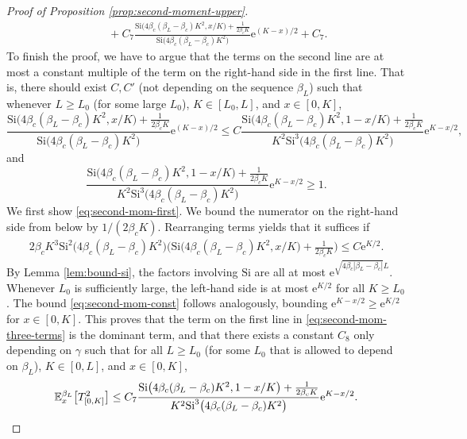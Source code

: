 \documentclass[a4paper, a4wide, 10pt, reqno]{amsart}
\theoremstyle{plain}
\theoremstyle{definition}
\numberwithin{equation}{section}
\newcommand{\E}{\mathbb E}
\newcommand{\re}{{\mathrm e}}
\newcommand{\Si}{{\mathrm{Si}}}
\begin{document}
\begin{proof}[Proof of  Proposition \ref{prop:second-moment-upper}]
\begin{equation}
\begin{aligned}
    &\hspace{15pt}+ C_7\frac{\Si\big(4\beta_c(\beta_L-\beta_c) K^2, x/ K\big)+\frac{1}{2\beta_c K}}{ \Si\big(4\beta_c(\beta_L-\beta_c) K^2\big)}\re^{(K-x)/2} + C_7.
    \end{aligned}
    \end{equation}
    To finish the proof, we have to argue that the terms on the second line are at most a constant multiple of the term on the right-hand side in the first line. That is, there should exist $C, C'$ (not depending on the sequence $\beta_L$) such that whenever $L\ge L_0$ (for some large $L_0$), $K\in[L_0, L]$, and $x\in[0, K]$, 
    \begin{equation}\label{eq:second-mom-first}
        \frac{\Si\big(4\beta_c(\beta_L-\beta_c) K^2, x/ K\big)+\frac{1}{2\beta_c K}}{ \Si\big(4\beta_c(\beta_L-\beta_c) K^2\big)}\re^{(K-x)/2}\le C\frac{\Si\big(4\beta_c(\beta_L-\beta_c) K^2, 1-x/ K\big)+\frac{1}{2\beta_c K}}{ K^2\Si^3\big(4\beta_c(\beta_L-\beta_c) K^2\big)}\re^{ K-x/2},
    \end{equation}
    and 
    \begin{equation}\label{eq:second-mom-const}
        \frac{\Si\big(4\beta_c(\beta_L-\beta_c) K^2, 1-x/ K\big)+\frac{1}{2\beta_c K}}{ K^2\Si^3\big(4\beta_c(\beta_L-\beta_c) K^2\big)}\re^{ K-x/2} \ge 1.
    \end{equation}
    We first show \eqref{eq:second-mom-first}. We bound the numerator on the right-hand side from below by $1/(2\beta_cK)$. Rearranging terms yields that it suffices if
    \begin{align}
        2\beta_cK^3\Si^2\big(4\beta_c(\beta_L-\beta_c) K^2\big)\Big(\Si\big(4\beta_c(\beta_L-\beta_c) K^2, x/ K\big)+\frac{1}{2\beta_c K}\Big)\le C\re^{ K/2}.
    \end{align}
    By Lemma \ref{lem:bound-si}, the factors involving $\Si$ are all at most $\re^{\sqrt{4\beta_c|\beta_L-\beta_c|}L}$. Whenever $L_0$ is sufficiently large, the left-hand side is at most $\re^{K/2}$ for all $K\ge L_0$. The bound \eqref{eq:second-mom-const} follows analogously, bounding $\re^{K-x/2}\ge \re^{K/2}$ for $x\in[0, K]$.
    This proves that the term on the first line in \eqref{eq:second-mom-three-terms} is the dominant term, and that there exists a constant $C_8$ only depending on $\gamma$ such that for all $L\ge L_0$ (for some $L_0$ that is allowed to depend on $\beta_L$), $K\in[0, L]$, and $x\in[0, K]$,
    \begin{equation*}
    \E_x^{\beta_L}\big[T_{[0, K]}^2\big] \le C_7\frac{\Si\big(4\beta_c(\beta_L-\beta_c) K^2, 1-x/ K\big)+\frac{1}{2\beta_c K}}{ K^2\Si^3\big(4\beta_c(\beta_L-\beta_c) K^2\big)}\re^{ K-x/2}.\qedhere
    \end{equation*}
\end{proof}
\end{document}

